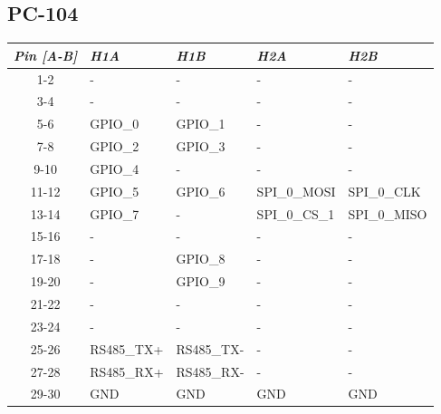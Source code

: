 \subsection{PC-104}

\begin{table}[!h]
    \centering
    \begin{tabular}{cllll}
        \toprule[1.5pt]
        \textit{Pin [A-B]} & \textit{H1A}     & \textit{H1B}     & \textit{H2A}  & \textit{H2B}  \\
        \midrule
        1-2                & -                & -                & -             & -             \\
        3-4                & -                & -                & -             & -             \\
        5-6                & GPIO\_0          & GPIO\_1          & -             & -             \\
        7-8                & GPIO\_2          & GPIO\_3          & -             & -             \\
        9-10               & GPIO\_4          & -                & -             & -             \\
        11-12              & GPIO\_5          & GPIO\_6          & SPI\_0\_MOSI  & SPI\_0\_CLK   \\
        13-14              & GPIO\_7          & -                & SPI\_0\_CS\_1 & SPI\_0\_MISO  \\
        15-16              & -                & -                & -             & -             \\
        17-18              & -                & GPIO\_8          & -             & -             \\
        19-20              & -                & GPIO\_9          & -             & -             \\
        21-22              & -                & -                & -             & -             \\
        23-24              & -                & -                & -             & -             \\
        25-26              & RS485\_TX+       & RS485\_TX-       & -             & -             \\
        27-28              & RS485\_RX+       & RS485\_RX-       & -             & -             \\
        29-30              & GND              & GND              & GND           & GND           \\

\end{tabular}
\end{table}
